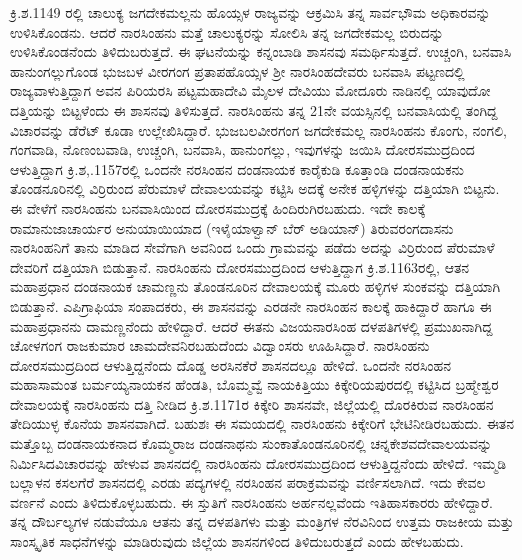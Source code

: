 ಕ್ರಿ.ಶ.1149 ರಲ್ಲಿ ಚಾಲುಕ್ಯ ಜಗದೇಕಮಲ್ಲನು ಹೊಯ್ಸಳ ರಾಜ್ಯವನ್ನು ಆಕ್ರಮಿಸಿ ತನ್ನ ಸಾರ್ವಭೌಮ ಅಧಿಕಾರವನ್ನು ಉಳಿಸಿಕೊಂಡನು. ಆದರೆ ನಾರಸಿಂಹನು ಮತ್ತೆ ಚಾಲುಕ್ಯರನ್ನು ಸೋಲಿಸಿ ತನ್ನ ಜಗದೇಕಮಲ್ಲ ಬಿರುದನ್ನು ಉಳಿಸಿಕೊಂಡನೆಂದು ತಿಳಿದುಬರುತ್ತದೆ. ಈ ಘಟನೆಯನ್ನು ಕನ್ನಂಬಾಡಿ ಶಾಸನವು ಸಮರ್ಥಿಸುತ್ತದೆ. ಉಚ್ಚಂಗಿ, ಬನವಾಸಿ ಹಾನುಂಗಲ್ಲುಗೊಂಡ ಭುಜಬಳ ವೀರಗಂಗ ಪ್ರತಾಪಹೊಯ್ಸಳ ಶ‍್ರೀ ನಾರಸಿಂಹದೇವರು ಬನವಾಸಿ ಪಟ್ಟಣದಲ್ಲಿ ರಾಜ್ಯವಾಳುತ್ತಿದ್ದಾಗ ಅವನ ಪಿರಿಯರಸಿ ಪಟ್ಟಮಹಾದೇವಿ ಮೈಲಳ ದೇವಿಯು ಮೋದೂರು ನಾಡಿನಲ್ಲಿ ಯಾವುದೋ ದತ್ತಿಯನ್ನು ಬಿಟ್ಟಳೆಂದು ಈ ಶಾಸನವು ತಿಳಿಸುತ್ತದೆ. ನಾರಸಿಂಹನು ತನ್ನ 21ನೇ ವಯಸ್ಸಿನಲ್ಲಿ ಬನವಾಸಿಯಲ್ಲಿ ತಂಗಿದ್ದ ವಿಚಾರವನ್ನು ಡೆರೆಟ್​ ಕೂಡಾ ಉಲ್ಲೇಖಿಸಿದ್ದಾರೆ. ಭುಜಬಲವೀರಗಂಗ ಜಗದೇಕಮಲ್ಲ ನಾರಸಿಂಹನು ಕೊಂಗು, ನಂಗಲಿ, ಗಂಗವಾಡಿ, ನೊಣಂಬವಾಡಿ, ಉಚ್ಚಂಗಿ, ಬನವಾಸಿ, ಹಾನುಂಗಲ್ಲು, ಇವುಗಳನ್ನು ಜಯಿಸಿ ದೋರಸಮುದ್ರದಿಂದ ಆಳುತ್ತಿದ್ದಾಗ ಕ್ರಿ.ಶ,.1157ರಲ್ಲಿ ಒಂದನೇ ನರಸಿಂಹನ ದಂಡನಾಯಕ ಕಾರೈಕುಡಿ ಕೂತ್ತಾಂಡಿ ದಂಡನಾಯಕನು ತೊಂಡನೂರಿನಲ್ಲಿ ವಿರ್ರಿರುಂದ ಪೆರುಮಾಳೆ ದೇವಾಲಯ\-ವನ್ನು ಕಟ್ಟಿಸಿ ಅದಕ್ಕೆ ಅನೇಕ ಹಳ್ಳಿಗಳನ್ನು ದತ್ತಿಯಾಗಿ ಬಿಟ್ಟನು. ಈ ವೇಳೆಗೆ ನಾರಸಿಂಹನು ಬನವಾಸಿಯಿಂದ ದೋರಸಮುದ್ರಕ್ಕೆ ಹಿಂದಿರುಗಿರಬಹುದು. ಇದೇ ಕಾಲಕ್ಕೆ ರಾಮಾನುಜಾಚಾರ್ಯರ ಅನುಯಾಯಿಯಾದ (ಇಳೈಯಾಳ್ವಾನ್​ ಬೆರ್‌ \hbox{ಅಡಿಯಾನ್​}) ತಿರುವರಂಗದಾಸನು ನಾರಸಿಂಹನಿಗೆ ತಾನು ಮಾಡಿದ ಸೇವೆಗಾಗಿ ಅವನಿಂದ ಒಂದು ಗ್ರಾಮವನ್ನು ಪಡೆದು ಅದನ್ನು ವಿರ್ರಿರುಂದ ಪೆರುಮಾಳೆ ದೇವರಿಗೆ ದತ್ತಿಯಾಗಿ ಬಿಡುತ್ತಾನೆ. ನಾರಸಿಂಹನು ದೋರಸಮುದ್ರದಿಂದ ಆಳುತ್ತಿದ್ದಾಗ ಕ್ರಿ.ಶ.1163ರಲ್ಲಿ, ಆತನ ಮಹಾಪ್ರಧಾನ ದಂಡನಾಯಕ ಚಾಮಣ್ಣನು ತೊಂಡನೂರಿನ ದೇವಾಲಯಕ್ಕೆ ಮೂರು ಹಳ್ಳಿಗಳ ಸುಂಕವನ್ನು ದತ್ತಿಯಾಗಿ ಬಿಡುತ್ತಾನೆ. ಎಪಿಗ್ರಾಫಿಯಾ ಸಂಪಾದಕರು, ಈ ಶಾಸನವನ್ನು ಎರಡನೇ ನಾರಸಿಂಹನ ಕಾಲಕ್ಕೆ ಹಾಕಿದ್ದಾರೆ ಹಾಗೂ ಈ ಮಹಾಪ್ರಧಾನನು ದಾಮಣ್ಣನೆಂದು ಹೇಳಿದ್ದಾರೆ. ಆದರೆ ಈತನು ವಿಜಯನಾರಸಿಂಹ ದಳಪತಿಗಳಲ್ಲಿ ಪ್ರಮುಖನಾಗಿದ್ದ ಚೋಳಗಂಗ ರಾಜಕುಮಾರ ಚಾಮದೇವನಿರಬಹುದೆಂದು ವಿದ್ವಾಂಸರು ಊಹಿಸಿದ್ದಾರೆ. ನಾರಸಿಂಹನು ದೋರಸಮುದ್ರದಿಂದ ಆಳುತ್ತಿದ್ದನೆಂದು ದೊಡ್ಡ ಅರಸಿನಕೆರೆ ಶಾಸನದಲ್ಲೂ ಹೇಳಿದೆ. ಒಂದನೇ ನರಸಿಂಹನ ಮಹಾಸಾಮಂತ ಬರ್ಮಯ್ಯನಾಯಕನ ಹೆಂಡತಿ, ಬೊಮ್ಮವ್ವೆ ನಾಯಕಿತ್ತಿಯು ಕಿಕ್ಕೇರಿಯಪುರದಲ್ಲಿ ಕಟ್ಟಿಸಿದ ಬ್ರಹ್ಮೇಶ್ವರ ದೇವಾಲಯಕ್ಕೆ ನಾರಸಿಂಹನು ದತ್ತಿ ನೀಡಿದ ಕ್ರಿ.ಶ.1171ರ ಕಿಕ್ಕೇರಿ ಶಾಸನವೇ, ಜಿಲ್ಲೆಯಲ್ಲಿ ದೊರಕಿರುವ ನಾರಸಿಂಹನ ತೇದಿಯುಳ್ಳ ಕೊನೆಯ ಶಾಸನವಾಗಿದೆ. ಬಹುಶಃ ಈ ಸಮಯದಲ್ಲಿ ನಾರಸಿಂಹನು ಕಿಕ್ಕೇರಿಗೆ ಭೇಟಿನೀಡಿರಬಹುದು. ಈತನ ಮತ್ತೊಬ್ಬ ದಂಡನಾಯಕನಾದ ಕೊಮ್ಮರಾಜ ದಂಡನಾಥನು ಸುಂಕಾತೊಂಡನೂರಿನಲ್ಲಿ ಚನ್ನಕೇಶವದೇವಾಲಯವನ್ನು ನಿರ್ಮಿಸಿದ\break ವಿಚಾರವನ್ನು ಹೇಳುವ ಶಾಸನದಲ್ಲಿ ನಾರಸಿಂಹನು ದೋರಸಮುದ್ರದಿಂದ ಆಳುತ್ತಿದ್ದನೆಂದು ಹೇಳಿದೆ. ಇಮ್ಮಡಿ ಬಲ್ಲಾಳನ ಕಸಲಗೆರೆ ಶಾಸನದಲ್ಲಿ ಎರಡು ಪದ್ಯಗಳಲ್ಲಿ ನರಸಿಂಹನ ಪರಾಕ್ರಮವನ್ನು ವರ್ಣಿಸಲಾಗಿದೆ. ಇದು ಕೇವಲ ವರ್ಣನೆ ಎಂದು ತಿಳಿದುಕೊಳ್ಳಬಹುದು. ಈ ಸ್ತುತಿಗೆ ನಾರಸಿಂಹನು ಅರ್ಹನಲ್ಲವೆಂದು ಇತಿಹಾಸಕಾರರು ಹೇಳಿದ್ದಾರೆ. ತನ್ನ ದೌರ್ಬಲ್ಯಗಳ ನಡುವೆಯೂ ಆತನು ತನ್ನ ದಳಪತಿಗಳು ಮತ್ತು ಮಂತ್ರಿಗಳ ನೆರವಿನಿಂದ ಉತ್ತಮ ರಾಜಕೀಯ ಮತ್ತು ಸಾಂಸ್ಕೃತಿಕ ಸಾಧನೆಗಳನ್ನು ಮಾಡಿರುವುದು ಜಿಲ್ಲೆಯ ಶಾಸನಗಳಿಂದ ತಿಳಿದುಬರುತ್ತದೆ ಎಂದು ಹೇಳಬಹುದು.

